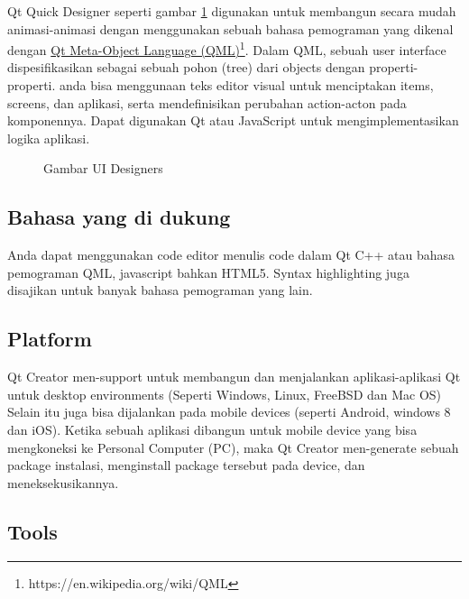 Qt Quick Designer seperti gambar \ref{fig:gambar-ui-designers}
digunakan untuk membangun secara mudah animasi-animasi
dengan menggunakan sebuah bahasa pemograman yang dikenal dengan
\href{https://en.wikipedia.org/wiki/QML}{Qt Meta-Object Language 
(QML)}\footnote{https://en.wikipedia.org/wiki/QML}.
Dalam QML, sebuah user interface dispesifikasikan sebagai sebuah pohon
(tree) dari objects dengan properti-properti. anda bisa menggunaan teks
editor visual untuk menciptakan items, screens, dan aplikasi, serta
mendefinisikan perubahan action-acton pada komponennya. Dapat digunakan
Qt atau JavaScript untuk mengimplementasikan logika aplikasi.

\begin{figure}[htbp]
\centering
{}
\caption{Gambar UI Designers}
\label{fig:gambar-ui-designers}
\end{figure}

\subsection{Bahasa yang di dukung}\label{bahasa-yang-di-dukung}

Anda dapat menggunakan code editor menulis code dalam Qt C++ atau bahasa
pemograman QML, javascript bahkan HTML5. Syntax highlighting juga
disajikan untuk banyak bahasa pemograman yang lain.

\subsection{Platform}\label{platform}

Qt Creator men-support untuk membangun dan menjalankan aplikasi-aplikasi
Qt untuk desktop environments (Seperti Windows, Linux, FreeBSD dan Mac
OS) Selain itu juga bisa dijalankan pada mobile devices (seperti
Android, windows 8 dan iOS). Ketika sebuah aplikasi dibangun untuk
mobile device yang bisa mengkoneksi ke Personal Computer (PC), maka Qt
Creator men-generate sebuah package instalasi, menginstall package
tersebut pada device, dan meneksekusikannya.

\subsection{Tools}\label{tools}

